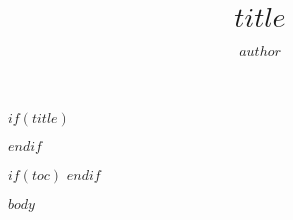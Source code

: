 \documentclass[11pt, openany]{book}
\title{$title$}
\author{$author$}
\date{} %
\begin{document}
$if(title)$
    \maketitle
$endif$

$if(toc)$
    \tableofcontents
$endif$

$body$

\end{document}
